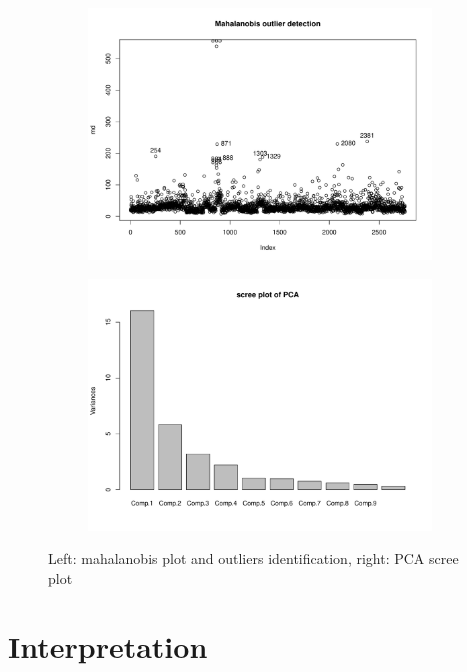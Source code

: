 \documentclass[11pt, a4paper,titlepage]{article}
\begin{document}
\begin{figure}[h]
  \begin{subfigure}{.5\textwidth}
    \centering
    \includegraphics[width=1\linewidth]{mahalanobis.pdf}
  \end{subfigure}%
  \begin{subfigure}{.5\textwidth}
    \centering
    \includegraphics[width=1\linewidth]{screeplot.pdf}
  \end{subfigure}
  \caption{Left: mahalanobis plot and outliers identification, right: PCA scree plot}
\end{figure}

\section{Interpretation}
\end{document}
